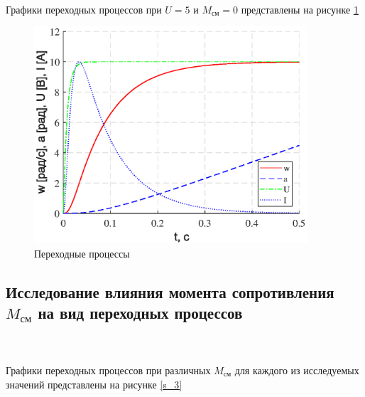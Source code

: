 \documentclass[a4paper,12pt]{article}
\begin{document}
	\paragraph {} Графики переходных процессов при $U=5$ и $M_{\text{см}}=0$ представлены на рисунке \ref{s_2}
		\begin{figure}[h!]
			\renewcommand{\figurename}{Рисунок}
			\centering
			\includegraphics[width=4in]{graph.eps}
			\caption{Переходные процессы}
			\label{s_2}
		\end{figure}
	\newpage
	\subsection{Исследование влияния момента сопротивления $M_{\text{см}}$ на вид переходных процессов}~~\\
		\paragraph {} Графики переходных процессов при различных $M_{\text{см}}$ для каждого из исследуемых значений представлены на рисунке \ref{s_3}\\
		
\end{document}
